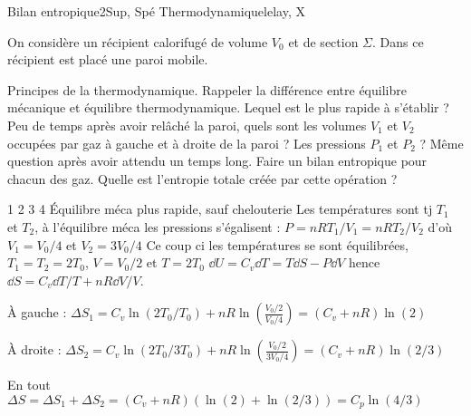 \begin{exercise}{Bilan entropique}{2}{Sup, Spé}
{Thermodynamique}{lelay, X}

On considère un récipient calorifugé de volume $V_0$ et de section $\Sigma$. Dans ce récipient est placé une paroi mobile.

\begin{questions}
    \questioncours Principes de la thermodynamique.
    \question Rappeler la différence entre équilibre mécanique et équilibre thermodynamique. Lequel est le plus rapide à s'établir ?
    \question Peu de temps après avoir relâché la paroi, quels sont les volumes $V_1$ et $V_2$ occupées par gaz à gauche et à droite de la paroi ? Les pressions $P_1$ et $P_2$ ?
    \question Même question après avoir attendu un temps long.
    \question Faire un bilan entropique pour chacun des gaz. Quelle est l'entropie totale créée par cette opération ?
\end{questions}

\end{exercise}

\begin{solution}

\begin{questions}
     1 2 3 4
    \question Équilibre méca plus rapide, sauf chelouterie
    \question Les températures sont tj $T_1$ et $T_2$, à l'équilibre méca les pressions s'égalisent : $P = nRT_1/V_1 = nRT_2/V_2$ d'où $V_1 = V_0/4$ et $V_2 = 3V_0/4$
    \question Ce coup ci les températures se sont équilibrées, $T_1=T_2 = 2T_0$, $V = V_0/2$ et $T = 2T_0$
    \question $\dd{U}= C_v \dd{T} = T\dd{S} -P\dd{V}$ hence $\dd{S} = C_v \dd{T}/T + nR\dd{V}/V$. 

    À gauche : $\Delta S_1 = C_v \ln(2T_0/T_0) + nR\ln(\frac{V_0/2}{V_0/4}) = (C_v+nR)\ln(2)$

    À droite : $\Delta S_2 = C_v \ln(2T_0/3T_0) + nR\ln(\frac{V_0/2}{3V_0/4}) = (C_v+nR)\ln(2/3)$

    En tout $\Delta S = \Delta S_1 + \Delta S_2 = (C_v + nR)(\ln(2)+\ln(2/3)) = C_p \ln(4/3)$
\end{questions}

\end{solution}
